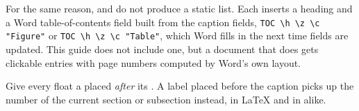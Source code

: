 For the same reason,  and  do not produce a static
list. Each inserts a heading and a Word table-of-contents field built from the caption
fields, \verb|TOC \h \z \c "Figure"| or \verb|TOC \h \z \c "Table"|, which Word fills in
the next time fields are updated. This guide does not include one, but a document that
does gets clickable entries with page numbers computed by Word's own layout.

\begin{tip}
Give every float a  placed \emph{after} its . A label placed
before the caption picks up the number of the current section or subsection
instead, in \LaTeX{} and in \texdocx{} alike.
\end{tip}
